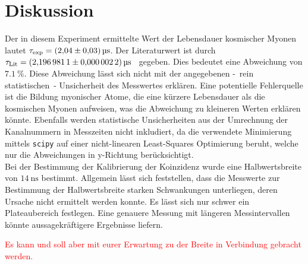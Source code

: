 \section{Diskussion}
\label{sec:Diskussion}
Der in diesem Experiment ermittelte Wert der Lebensdauer kosmischer Myonen lautet $\tau_\text{exp} = \qty{2.04 +- 0.03}{\micro\second}$. Der Literaturwert ist 
durch $\tau_\text{Lit} = \qty{2.1969811+-0.0000022}{\micro\second}$~\cite{PDG:muon} gegeben. Dies bedeutet eine Abweichung von $\qty{7.1}{\percent}$. 
Diese Abweichung lässt sich nicht mit der angegebenen -~rein statistischen~- Unsicherheit des Messwertes erklären. Eine potentielle Fehlerquelle
ist die Bildung myonischer Atome, die eine kürzere Lebensdauer als die kosmischen Myonen aufweisen, was die Abweichung zu kleineren Werten erklären könnte.
Ebenfalls werden statistische Unsicherheiten aus der Umrechnung der Kanalnummern in Messzeiten nicht inkludiert, 
da die verwendete Minimierung mittels \texttt{scipy} auf einer nicht-linearen Least-Squares Optimierung beruht, welche nur die Abweichungen in y-Richtung berücksichtigt.\\ 
Bei der Bestimmung der Kalibrierung der 
Koinzidenz wurde eine Halbwertsbreite von $\qty{14}{\nano\second}$ bestimmt. Allgemein lässt sich feststellen, dass die Messwerte zur Bestimmung der Halbwertsbreite 
starken Schwankungen unterliegen, deren Ursache nicht ermittelt werden konnte. Es lässt sich nur schwer ein Plateaubereich festlegen.
Eine genauere Messung mit längeren Messintervallen könnte aussagekräftigere Ergebnisse liefern.

\textcolor{red}{Es kann und soll aber mit eurer Erwartung zu der Breite in Verbindung gebracht werden.}
